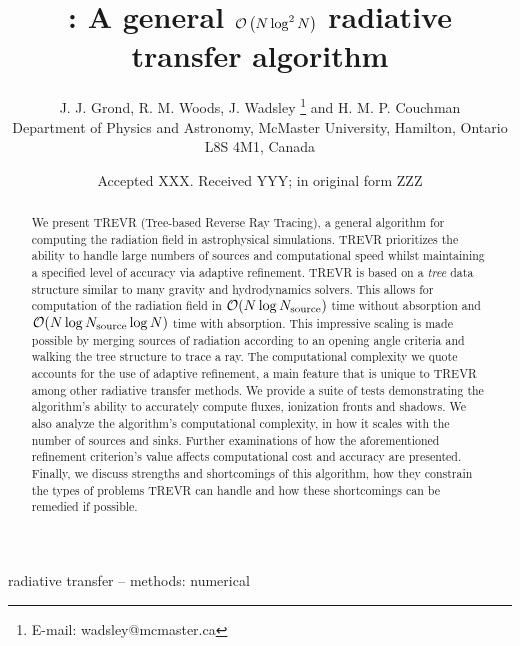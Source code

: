 \documentclass[fleq,usenatbib]{mnras}
\title[]{\acro{}: A general $\mathcal{O}\left(N\log^2N\right)$ radiative transfer algorithm}
\author[J. J. Grond et al.]{
J. J. Grond,
R. M. Woods,
J. Wadsley \thanks{E-mail:  wadsley@mcmaster.ca}
and H. M. P. Couchman
\\
Department of Physics and Astronomy, McMaster University, Hamilton, Ontario L8S
 4M1, Canada}
\date{Accepted XXX. Received YYY; in original form ZZZ}
\newcommand{\acro}{TREVR}
\newcommand{\NS}{N_{\rm source}}
\begin{document}
\label{firstpage}
\pagerange{\pageref{firstpage}--\pageref{lastpage}}
\maketitle

\begin{abstract}
We present \acro{} (Tree-based Reverse Ray Tracing), a general algorithm for 
computing the radiation field in astrophysical simulations. \acro{} 
prioritizes the ability to handle large numbers of sources and computational 
speed whilst maintaining a specified level of accuracy via adaptive 
refinement. \acro{} is based on a \emph{tree} data structure similar to many 
gravity and hydrodynamics solvers. This allows for computation of the 
radiation field in $\mathcal{O}(N \log \NS)$ time without 
absorption and $\mathcal{O}(N \log \NS \log{N})$ time with 
absorption. This impressive  scaling is made possible by merging sources of 
radiation according to an opening angle criteria and walking the tree 
structure to trace a ray. The computational complexity we quote accounts for 
the use of adaptive refinement, a main feature that is unique to \acro{} among 
other radiative transfer methods. We provide a suite of tests demonstrating 
the algorithm's ability to accurately compute fluxes, ionization fronts and 
shadows. We also analyze the algorithm's computational complexity, in how it 
scales with the number of sources and sinks. Further examinations of how the 
aforementioned refinement criterion's value affects computational cost and 
accuracy are presented. Finally, we discuss strengths and shortcomings of this 
algorithm, how they constrain the types of problems \acro{} can handle and how 
these shortcomings can be remedied if possible.

\end{abstract}

\begin{keywords}
radiative transfer -- methods: numerical
\end{keywords}


\end{document}
